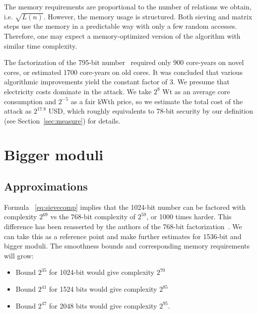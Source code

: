 \documentclass[a4paper]{article}
\begin{document}
The memory requirements are proportional to the number of relations we obtain, i.e. $\sqrt{L(n)}$. However, the memory usage is structured. Both sieving and matrix steps use the memory in a predictable way with only a few random accesses. Therefore, one may expect a memory-optimized version of the algorithm with similar time complexity.

The factorization of the 795-bit number~\cite{factor795} required only 900 core-years on novel cores, or estimated 1700 core-years on old cores. It was concluded that various algorithmic improvements yield the constant factor of 3. We presume that electricity costs dominate in the attack. We take $2^8$ Wt as an average core consumption and $2^{-5}$ as a fair kWth price, so we  estimate the total cost of the attack as   $2^{17.8}$ USD, which roughly equivalents to 78-bit security by our definition (see Section~\ref{sec:measure}) for details.

\section{Bigger moduli}
\subsection{Approximations}\label{sec:approx}
Formula ~\eqref{eq:sievecomp} implies that the 1024-bit number can be factored with complexity $2^{69}$ vs the 768-bit complexity of $2^{59}$, or 1000 times harder. This difference has been reasserted by the authors of the 768-bit factorization~\cite{DBLP:conf/crypto/KleinjungAFLTBGKMORTZ10}. We can take this as a reference point and make further estimates for 1536-bit and bigger moduli. The smoothness bounds and corresponding memory requirements will grow:
\begin{itemize}
    \item Bound $2^{35}$ for 1024-bit would give complexity $2^{70}$
    \item Bound $2^{41}$ for 1524 bits would give complexity $2^{85}$
    \item Bound $2^{47}$ for 2048 bits would give complexity $2^{95}$.
 \end{itemize}
 
\end{document}
